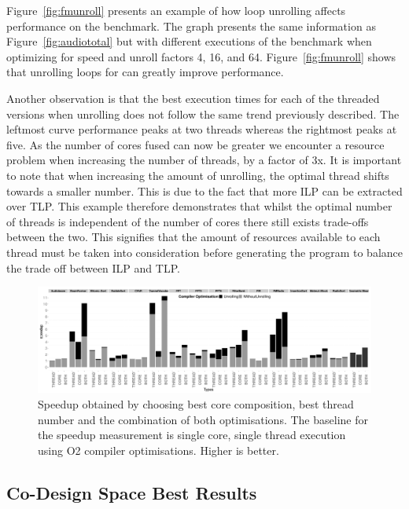 Figure~\ref{fig:fmunroll} presents an example of how loop unrolling affects performance on the  benchmark.
The graph presents the same information as Figure~\ref{fig:audiototal} but with different executions of the benchmark when optimizing for speed and unroll factors 4, 16, and 64.
Figure~\ref{fig:fmunroll} shows that unrolling loops for  can greatly improve performance.

Another observation is that the best execution times for each of the threaded versions when unrolling does not follow the same trend previously described.
The leftmost curve performance peaks at two threads whereas the rightmost peaks at five.
As the number of cores fused can now be greater we encounter a resource problem when increasing the number of threads, by a factor of 3x.
It is important to note that when increasing the amount of unrolling, the optimal thread shifts towards a smaller number.
This is due to the fact that more ILP can be extracted over TLP.
This example therefore demonstrates that whilst the optimal number of threads is independent of the number of cores there still exists trade-offs between the two.
This signifies that the amount of resources available to each thread must be taken into consideration before generating the program to balance the trade off between ILP and TLP.

\begin{figure}
 \centering
  \centering
    \includegraphics[width=1\textwidth]{streamit-paper/graphics/threadcompbench.pdf}
    \caption{Speedup obtained by choosing best core composition, best
      thread number and the combination of both optimisations. The baseline for the speedup measurement is single core, single thread execution using O2 compiler optimisations. Higher
      is better.}\label{fig:overviewhist}
\end{figure}

\subsection{Co-Design Space Best Results}

